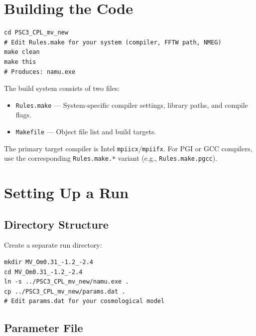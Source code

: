 \documentclass[11pt,fleqn]{book}
\newcommand{\code}[1]{\texttt{#1}}
\newcommand{\file}[1]{\texttt{#1}}
\begin{document}
\section{Building the Code}

\begin{codebox}
\begin{lstlisting}[style=bash,numbers=none]
cd PSC3_CPL_mv_new
# Edit Rules.make for your system (compiler, FFTW path, NMEG)
make clean
make this
# Produces: namu.exe
\end{lstlisting}
\end{codebox}

The build system consists of two files:
\begin{itemize}[leftmargin=2em]
  \item \file{Rules.make} --- System-specific compiler settings, library paths, and compile flags.
  \item \file{Makefile} --- Object file list and build targets.
\end{itemize}

\begin{remark}
The primary target compiler is Intel \code{mpiicx}/\code{mpiifx}.  For PGI or GCC compilers, use the corresponding \file{Rules.make.*} variant (e.g., \file{Rules.make.pgcc}).
\end{remark}

\section{Setting Up a Run}

\subsection{Directory Structure}

Create a separate run directory:

\begin{codebox}
\begin{lstlisting}[style=bash,numbers=none]
mkdir MV_Om0.31_-1.2_-2.4
cd MV_Om0.31_-1.2_-2.4
ln -s ../PSC3_CPL_mv_new/namu.exe .
cp ../PSC3_CPL_mv_new/params.dat .
# Edit params.dat for your cosmological model
\end{lstlisting}
\end{codebox}

\subsection{Parameter File}
\end{document}
